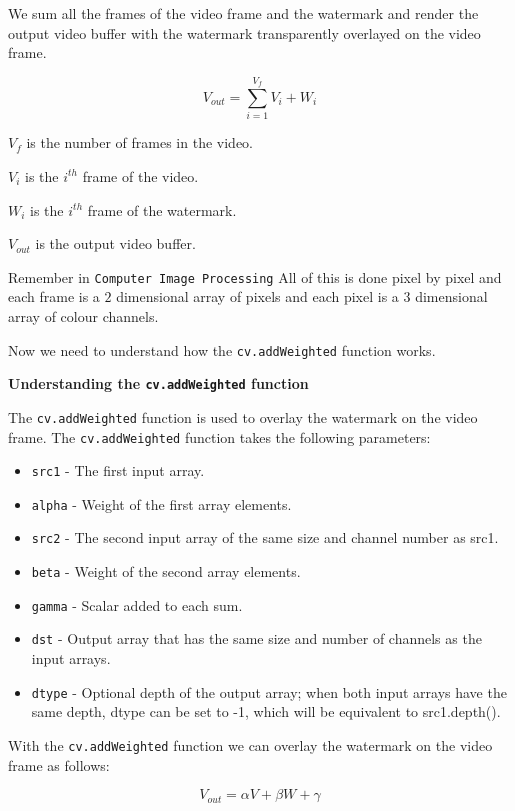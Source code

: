 \documentclass[ebook,12pt,oneside,openany]{memoir}
\begin{document}
We sum all the frames of the video frame and the watermark and render the output video buffer with the watermark transparently overlayed on the video frame.

\begin{equation}
    V_{out} = \sum_{i=1}^{V_{f}} V_{i} + W_{i}
\end{equation}

$V_{f}$ is the number of frames in the video.

$V_{i}$ is the $i^{th}$ frame of the video.

$W_{i}$ is the $i^{th}$ frame of the watermark.

$V_{out}$ is the output video buffer.

Remember in \verb|Computer Image Processing|  
All of this is done pixel by pixel and each frame is a $2$ dimensional array of pixels and each pixel is a $3$ dimensional array of colour channels.

Now we need to understand how the \verb|cv.addWeighted| function works.

\textbf{Understanding the \verb|cv.addWeighted| function}

The \verb|cv.addWeighted| function is used to overlay the watermark on the video frame. The \verb|cv.addWeighted| function takes the following parameters:

\begin{itemize}
\item \verb|src1| - The first input array.
\item \verb|alpha| - Weight of the first array elements.
\item \verb|src2| - The second input array of the same size and channel number as src1.
\item \verb|beta| - Weight of the second array elements.
\item \verb|gamma| - Scalar added to each sum.
\item \verb|dst| - Output array that has the same size and number of channels as the input arrays.
\item \verb|dtype| - Optional depth of the output array; when both input arrays have the same depth, dtype can be set to -1, which will be equivalent to src1.depth().
\end{itemize}

With the \verb|cv.addWeighted| function we can overlay the watermark on the video frame as follows:

\begin{equation}
V_{out} = \alpha V + \beta W + \gamma
\end{equation}
\end{document}
